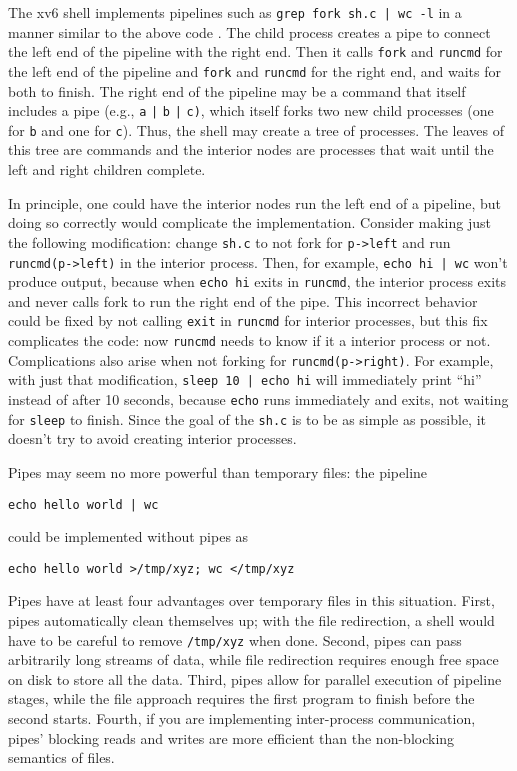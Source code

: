 The xv6 shell implements pipelines such as
\lstinline{grep fork sh.c | wc -l}
in a manner similar to the above code
.
The child process creates a pipe to connect the left end of the pipeline
with the right end. Then it calls
\lstinline{fork}
and
\lstinline{runcmd}
for the left end of the pipeline
and 
\lstinline{fork}
and
\lstinline{runcmd}
for the right end, and waits for both to finish.
The right end of the pipeline may be a command that itself includes a
pipe (e.g.,
\lstinline{a}
\lstinline{|}
\lstinline{b}
\lstinline{|}
\lstinline{c)}, 
which itself forks two new child processes (one for
\lstinline{b}
and one for
\lstinline{c}).
Thus, the shell may
create a tree of processes.  The leaves of this tree are commands and
the interior nodes are processes that wait until the left and right
children complete.

In principle, one could have the interior nodes run the left end of a
pipeline, but doing so correctly would complicate the
implementation. Consider making just the following modification:
change \lstinline{sh.c} to not fork for \lstinline{p->left} and run
\lstinline{runcmd(p->left)} in the interior process. Then, for
example, \lstinline{echo hi | wc} won't produce output, because when
\lstinline{echo hi} exits in \lstinline{runcmd}, the interior process
exits and never calls fork to run the right end of the pipe.  This
incorrect behavior could be fixed by not calling \lstinline{exit} in
\lstinline{runcmd} for interior processes, but this fix complicates
the code: now \lstinline{runcmd} needs to know if it a interior
process or not.  Complications also arise when not forking for
\lstinline{runcmd(p->right)}.  For example, with just that modification,
\lstinline{sleep 10 | echo hi} will immediately print ``hi'' instead
of after 10 seconds, because \lstinline{echo} runs immediately and
exits, not waiting for \lstinline{sleep} to finish.  Since the goal of
the \lstinline{sh.c} is to be as simple as possible, it doesn't try to
avoid creating interior processes.

Pipes may seem no more powerful than temporary files:
the pipeline
\begin{lstlisting}[]
echo hello world | wc
\end{lstlisting}
could be implemented without pipes as
\begin{lstlisting}[]
echo hello world >/tmp/xyz; wc </tmp/xyz
\end{lstlisting}
Pipes have at least four advantages over temporary files
in this situation.
First, pipes automatically clean themselves up;
with the file redirection, a shell would have to
be careful to remove
\lstinline{/tmp/xyz}
when done.
Second, pipes can pass arbitrarily long streams of
data, while file redirection requires enough free space
on disk to store all the data.
Third, pipes allow for parallel execution of pipeline stages,
while the file approach requires the first program to finish
before the second starts.
Fourth, if you are implementing inter-process communication,
pipes' blocking reads and writes are more efficient
than the non-blocking semantics of files.
